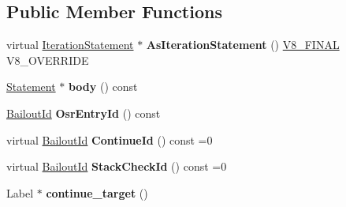 \subsection*{Public Member Functions}
\begin{DoxyCompactItemize}
\item 
\hypertarget{classv8_1_1internal_1_1_iteration_statement_a33d3528267615c8feed20c96723be815}{}virtual \hyperlink{classv8_1_1internal_1_1_iteration_statement}{Iteration\+Statement} $\ast$ {\bfseries As\+Iteration\+Statement} () \hyperlink{classv8_1_1internal_1_1_v8___f_i_n_a_l}{V8\+\_\+\+F\+I\+N\+A\+L} V8\+\_\+\+O\+V\+E\+R\+R\+I\+D\+E\label{classv8_1_1internal_1_1_iteration_statement_a33d3528267615c8feed20c96723be815}

\item 
\hypertarget{classv8_1_1internal_1_1_iteration_statement_aa215b5d870f4f4b3643a1a612816ce93}{}\hyperlink{classv8_1_1internal_1_1_statement}{Statement} $\ast$ {\bfseries body} () const \label{classv8_1_1internal_1_1_iteration_statement_aa215b5d870f4f4b3643a1a612816ce93}

\item 
\hypertarget{classv8_1_1internal_1_1_iteration_statement_a095235d0a9e508a2484a3a6a31abb655}{}\hyperlink{classv8_1_1internal_1_1_bailout_id}{Bailout\+Id} {\bfseries Osr\+Entry\+Id} () const \label{classv8_1_1internal_1_1_iteration_statement_a095235d0a9e508a2484a3a6a31abb655}

\item 
\hypertarget{classv8_1_1internal_1_1_iteration_statement_a733531d31ebaaa92af8848a5489394e9}{}virtual \hyperlink{classv8_1_1internal_1_1_bailout_id}{Bailout\+Id} {\bfseries Continue\+Id} () const =0\label{classv8_1_1internal_1_1_iteration_statement_a733531d31ebaaa92af8848a5489394e9}

\item 
\hypertarget{classv8_1_1internal_1_1_iteration_statement_af644260c854f6dec422e9bac39fd9351}{}virtual \hyperlink{classv8_1_1internal_1_1_bailout_id}{Bailout\+Id} {\bfseries Stack\+Check\+Id} () const =0\label{classv8_1_1internal_1_1_iteration_statement_af644260c854f6dec422e9bac39fd9351}

\item 
\hypertarget{classv8_1_1internal_1_1_iteration_statement_aa7abfb37a65b3f2812b88d8674ed7df0}{}Label $\ast$ {\bfseries continue\+\_\+target} ()\label{classv8_1_1internal_1_1_iteration_statement_aa7abfb37a65b3f2812b88d8674ed7df0}

\end{DoxyCompactItemize}
